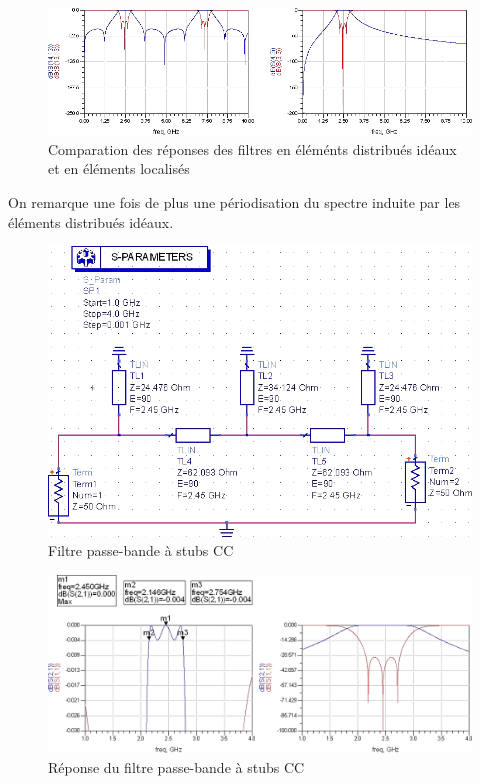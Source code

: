 \documentclass[10pt]{article}
\begin{document}
\begin{figure}
    \begin{center}
        \includegraphics[width=15cm]{p19_Simu}
    \end{center}
    \caption{Comparation des réponses des filtres en éléménts distribués idéaux et en éléments localisés}
\end{figure}

On remarque une fois de plus une périodisation du spectre induite par les éléments distribués idéaux.

\begin{figure}
    \begin{center}
        \includegraphics[width=15cm]{p19_circuit2}
    \end{center}
    \caption{Filtre passe-bande à stubs CC}
\end{figure}

\begin{figure}
    \begin{center}
        \includegraphics[width=15cm]{p19_Simu2}
    \end{center}
    \caption{Réponse du filtre passe-bande à stubs CC}
\end{figure}
\end{document}
